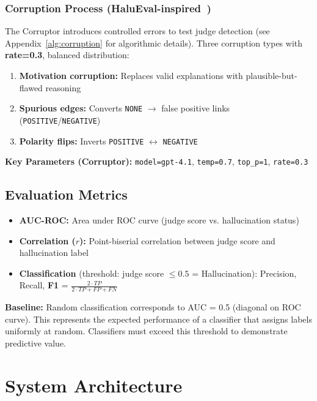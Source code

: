 \subsubsection{Corruption Process (HaluEval-inspired~\cite{li2023halueval})}
The Corruptor introduces controlled errors to test judge detection (see Appendix~\ref{alg:corruption} for algorithmic details). Three corruption types with \textbf{rate=0.3}, balanced distribution:
\begin{enumerate}[noitemsep]
    \item \textbf{Motivation corruption:} Replaces valid explanations with plausible-but-flawed reasoning
    \item \textbf{Spurious edges:} Converts \texttt{NONE} $\rightarrow$ false positive links (\texttt{POSITIVE}/\texttt{NEGATIVE})
    \item \textbf{Polarity flips:} Inverts \texttt{POSITIVE} $\leftrightarrow$ \texttt{NEGATIVE}
\end{enumerate}

\textbf{Key Parameters (Corruptor):} \texttt{model=gpt-4.1}, \texttt{temp=0.7}, \texttt{top\_p=1}, \texttt{rate=0.3}

\subsection{Evaluation Metrics}
\label{sec:evaluation_metrics}

\begin{itemize}[noitemsep]
    \item \textbf{AUC-ROC:} Area under ROC curve (judge score vs. hallucination status)
    \item \textbf{Correlation ($r$):} Point-biserial correlation between judge score and hallucination label
    \item \textbf{Classification} (threshold: judge score $\leq 0.5$ = Hallucination): Precision, Recall, \textbf{F1} = $\frac{2 \cdot TP}{2 \cdot TP + FP + FN}$
\end{itemize}

\textbf{Baseline:} Random classification corresponds to AUC = 0.5 (diagonal on ROC curve). This represents the expected performance of a classifier that assigns labels uniformly at random. Classifiers must exceed this threshold to demonstrate predictive value.

\section{System Architecture}
\label{sec:system_architecture}

